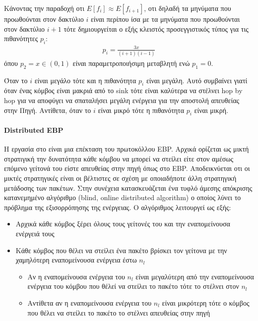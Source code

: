 Κάνοντας την παραδοχή οτι $E[f_{i}] \approx E[f_{i+1}]$, οτι δηλαδή τα μηνύματα που προωθούνται στον δακτύλιο $i$ είναι περίπου ίσα με τα μηνύματα που προωθούνται
στον δακτύλιο $i+1$ τότε δημιουργείται ο εξής κλειστός προσεγγιστικός τύπος για τις πιθανότητες $p_{i}$:
\begin{align*}
p_{i} = \frac{3x}{(i+1)(i-1)}
\end{align*}
όπου $p_{2} = x \in (0,1)$ είναι παραμετροποιήσιμη μεταβλητή ενώ $p_{1} =0$.

Όταν το $i$ είναι μεγάλο τότε και η πιθανότητα $p_{i}$ είναι μεγάλη. Αυτό συμβαίνει γιατί όταν ένας κόμβος είναι μακριά από το sink τότε είναι
καλύτερα να στέλνει hop by hop για να αποφύγει να σπαταλήσει μεγάλη ενέργεια για την αποστολή απευθείας στην Πηγή. Αντίθετα, όταν το $i$ είναι μικρό τότε η
πιθανότητα $p_{i}$ είναι μικρή.

\paragraph{Distributed EBP} Η εργασία στο \cite{debp_protocol} είναι μια επέκταση του πρωτοκόλλου EBP. Αρχικά
ορίζεται ως μικτή στρατιγική την δυνατότητα κάθε κόμβου να μπορεί να στείλει είτε στον αμέσως επόμενο γείτονά του είστε απευθείας στην πηγή όπως στο EBP.
Αποδεικνύεται οτι οι μικτές στρατηγικές είναι οι βέλτιστες σε σχέση με οποιαδήποτε άλλη στρατηγική μετάδοσης των πακέτων. Στην συνέχεια κατασκευάζεται ένα τυφλό
άμεσης απόκρισης κατανεμημένο αλγόριθμο (blind, online distributed algorithm) ο οποίος λύνει το πρόβλημα της εξισορρόπησης της ενέργειας. Ο αλγόριθμος λειτουργεί ως
εξής:
\begin{itemize}
\item Αρχικά κάθε κόμβος ξέρει όλους τους γείτονές του και την εναπομείνουσα ενέργειά τους
\item Κάθε κόμβος που θέλει να στείλει ένα πακέτο βρίσκει τον γείτονα με την χαμηλότερη εναπομείνουσα ενέργεια έστω $n_{l}$
	\begin{itemize}
	\item Αν η εναπομείνουσα ενέργεια του $n_{l}$ είναι μεγαλύτερη από την εναπομείνουσα ενέργεια του κόμβου που θέλεί να στείλει το πακέτο τότε το στέλνει στον
$n_{l}$
	\item Αντίθετα αν η εναπομείνουσα ενέργεια του $n_{l}$ είναι μικρότερη τότε ο κόμβος που θέλει να στείλει το πακέτο το στέλνει απευθείας στην πηγή
	\end{itemize}
\end{itemize}


